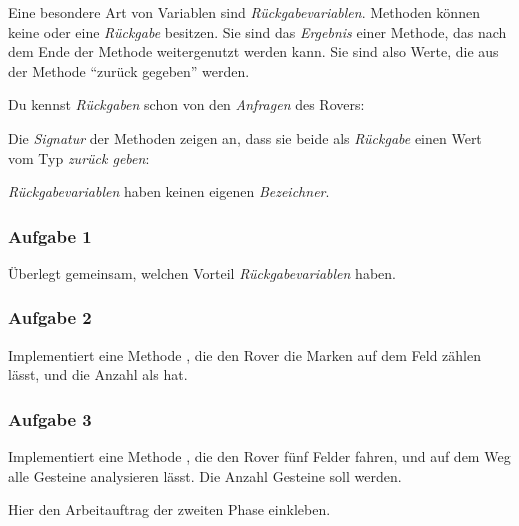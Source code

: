 \documentclass[10pt, a4paper]{scrartcl}
\begin{document}
\clearpage
\ReiheTitel[Rückgaben]

Eine besondere Art von Variablen sind \emph{Rückgabevariablen}. Methoden können keine oder eine \emph{Rückgabe} besitzen. Sie sind das \emph{Ergebnis} einer Methode, das nach dem Ende der Methode weitergenutzt werden kann. Sie sind also Werte, die aus der Methode \enquote{zurück gegeben} werden.

Du kennst \emph{Rückgaben} schon von den \emph{Anfragen} des Rovers:
\begin{smallitemize}
	\item {}
	\item {}
\end{smallitemize}

Die \emph{Signatur} der Methoden zeigen an, dass sie beide als \emph{Rückgabe} einen Wert vom Typ  \emph{zurück geben}: 

\emph{Rückgabevariablen} haben keinen eigenen \emph{Bezeichner}.

\subsubsection*{Aufgabe 1}
Überlegt gemeinsam, welchen Vorteil \emph{Rückgabevariablen} haben.

\subsubsection*{Aufgabe 2}
Implementiert eine Methode , die den Rover die Marken auf dem Feld zählen lässt, und die Anzahl als  hat.


\subsubsection*{Aufgabe 3}
Implementiert eine Methode , die den Rover fünf Felder fahren, und auf dem Weg
alle Gesteine analysieren lässt. Die Anzahl Gesteine soll  werden.

\vspace{2cm}
\begin{tcolorbox}[colframe=black!60,colback=black!10,width=\textwidth,height=5cm,center,boxrule=1pt]
\begin{center}
Hier den Arbeitauftrag der zweiten Phase einkleben.
\end{center}
\end{tcolorbox}
\end{document}
